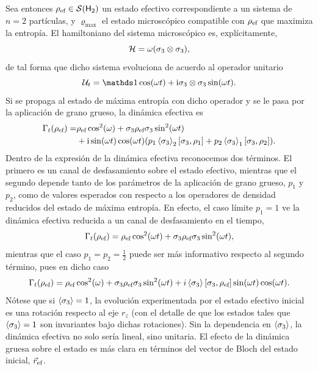 Sea entonces $\rho_{\text{ef}}\in\mathcal{S}({\sf H}_{2})$ un estado efectivo correspondiente a un sistema de $n=2$ partículas, y $\varrho_{\max}$ el estado microscópico compatible con $\rho_{\text{ef}}$ que maximiza la entropía. El hamiltoniano del sistema microscópico es, explícitamente,
\begin{equation}
    \mathcal{H}=\omega\qty(\sigma_{3}\otimes\sigma_{3}),\nonumber
\end{equation}
de tal forma que dicho sistema evoluciona de acuerdo al operador unitario
\begin{equation}
    \mcU_{t}=\Id \cos(\omega t)+ \rmi \pauli{3}\otimes\pauli{3} \sin(\omega t).\nonumber
\end{equation}
Si se propaga al estado de máxima entropía con dicho operador y se le pasa por la aplicación de grano grueso, la dinámica efectiva es
\begin{align}
    \Gamma_{t}(\rho_{\text{ef}})=&\rho_{\text{ef}} \cos^{2}(\omega)+\sigma_{3} \rho_{\text{ef}} \sigma_{3} \sin^{2}(\omega t)\nonumber\\
    & + \text{i} \sin(\omega t)\cos(\omega t)\qty(p_{1}\expval{\sigma_{3}}_{2}[\sigma_{3},\rho_{1}]+p_{2}\expval{\sigma_{3}}_{1}[\sigma_{3},\rho_{2}]).\nonumber
\end{align}
Dentro de la expresión de la dinámica efectiva reconocemos dos términos. El primero es un canal de desfasamiento sobre el estado efectivo, mientras que el segundo depende tanto de los parámetros de la aplicación de grano grueso, $p_{1}$ y $p_{2}$, como de valores esperados con respecto a los operadores de densidad reducidos del estado de máxima entropía. En efecto, el caso límite $p_{1}=1$ ve la dinámica efectiva reducida a un canal de desfasamiento en el tiempo,
\begin{equation}\label{eq:EffectiveIsing2}
    \Gamma_{t}(\rho_{\text{ef}})=\rho_{\text{ef}} \cos^{2}(\omega t)+\sigma_{3} \rho_{\text{ef}} \sigma_{3} \sin^{2}(\omega t),\nonumber
\end{equation}
mientras que el caso $p_{1}=p_{2}=\frac{1}{2}$ puede ser más informativo respecto al segundo término, pues en dicho caso
\begin{equation}
    \Gamma_{t}(\rho_{\text{ef}})=\rho_{\text{ef}} \cos^{2}(\omega)+\sigma_{3} \rho_{\text{ef}} \sigma_{3} \sin^{2}(\omega t) + i\expval{\sigma_{3}} \qty[\sigma_{3},\rho_{\text{ef}}] \sin(\omega t)\cos(\omega t).\nonumber
\end{equation}
Nótese que si $\expval{\sigma_{3}}=1$, la evolución experimentada por el estado efectivo inicial es una rotación respecto al eje $r_{z}$ (con el detalle de que los estados tales que $\expval{\sigma_{3}}=1$ son invariantes bajo dichas rotaciones). Sin la dependencia en $\expval{\sigma_{3}}$, la dinámica efectiva no solo sería lineal, sino unitaria. El efecto de la dinámica gruesa sobre el estado es más clara en términos del vector de Bloch del estado inicial, $\vec{r}_{\text{ef}}$. 
